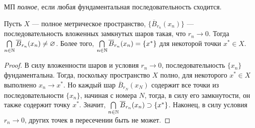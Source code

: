 \begin{definition}
МП \textit{полное}, если любая фундаментальная последовательность сходится.
\end{definition}

\begin{theorem}\label{kantor-compact}
    Пусть $X$ --- полное метрическое пространство, $\big\{\overline{B}_{r_n}(x_n)\big\}$ --- последовательность вложенных замкнутых шаров такая, что $r_n \to 0$. Тогда $\bigcap\limits_{n \in \mathbb{N}} \overline{B}_{r_n}(x_n) \neq \varnothing$. Более того, $\bigcap\limits_{n \in \mathbb{N}} \overline B_{r_n}(x_n) = \{x^*\}$ для некоторой точки $x^* \in X$.
\end{theorem}
\begin{proof}
    В силу вложенности шаров и условия $r_n \to 0$, последовательность $\{x_n\}$ фундаментальна. Тогда, поскольку пространство $X$ полно, для некоторого $x^* \in X$ выполнено $x_n \to x^*$. Но каждый шар $\overline B_{r_N}(x_N)$ содержит все точки из последовательности $\{x_n\}$, начиная с номера $N$, тогда, в силу его замкнутости, он также содержит точку $x^*$. Значит, $\bigcap\limits_{n \in \mathbb{N}} \overline B_{r_n}(x_n) \supset \{x^*\}$. Наконец, в силу условия $r_n \to 0$, других точек в пересечении быть не может.
\end{proof}

